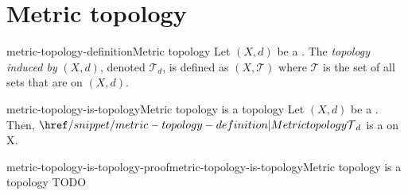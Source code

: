 \documentclass[preview]{standalone}
\begin{document}
\genpage

\newcommand\ts{{(X, \mathcal{T})}}

\section{Metric topology}

\begin{snippetdefinition}{metric-topology-definition}{Metric topology}
    Let \((X, d)\) be a \metricspace. The \textit{topology induced by} \((X, d)\),
    denoted \(\mathcal{T}_d\), is defined as \((X, \mathcal{T})\)
    where \(\mathcal{T}\) is the set of all sets that are \msopenset on \((X, d)\).
\end{snippetdefinition}

\begin{snippetproposition}{metric-topology-is-topology}{Metric topology is a topology}
    Let \((X, d)\) be a \metricspace. Then, \(\metrictopology_d\) is a \topologicalspace[topology][Topology]
    on X.
\end{snippetproposition}

\begin{snippetproof}{metric-topology-is-topology-proof}{metric-topology-is-topology}{Metric topology is a topology}
    TODO
\end{snippetproof}
\end{document}
